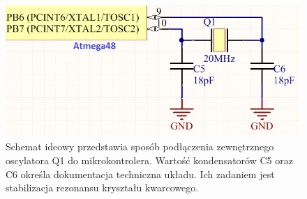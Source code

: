   \begin{figure}[H]
    \begin{center}
      \includegraphics[scale=0.45]{imgs/xtal.png}
 	\caption[Podłączenie rezonatora kwarcowego.]{\small{Schemat ideowy przedstawia sposób podłączenia zewnętrznego oscylatora Q1 do mikrokontrolera. Wartość kondensatorów C5 oraz C6 określa dokumentacja techniczna układu. Ich zadaniem jest stabilizacja rezonansu kryształu kwarcowego. }}
	\label{xxtal}
    \end{center}
  \end{figure}   
  